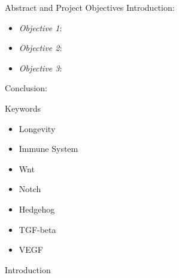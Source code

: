 


\setlength{\belowcaptionskip}{2ex}
\setlength\belowdisplayshortskip{2ex}
\begin{frame}[t]
\begin{columns}[t]
\begin{column}{\onecolwid} %
\begin{alertblock}{Abstract and Project Objectives}
Introduction:
\begin{itemize}
\item \textit{Objective 1}: 
\item \textit{Objective 2}: 
\item \textit{Objective 3}: 
\end{itemize}
Conclusion:
\end{alertblock}
\begin{block}{Keywords}
\begin{itemize}
\item Longevity
\item Immune System
\item Wnt
\item Notch
\item Hedgehog
\item TGF-beta
\item VEGF
\end{itemize}	
\end{block}
\begin{alertblock}{Introduction}


\end{alertblock}
\end{column}
\end{columns}
\end{frame}
